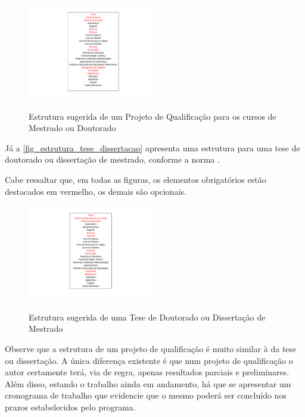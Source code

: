 \begin{apendicesenv}
    \begin{figure}[!htb]
        \centering
        \caption{Estrutura sugerida de um Projeto de Qualificação para os cursos de Mestrado ou Doutorado}
        \includegraphics[width=0.5\textwidth]{figuras/estrutura-projeto-qualificacao}
        \label{fig_estrutura_projeto_qualificacao}
    \end{figure}

    Já a \autoref{fig_estrutura_tese_dissertacao} apresenta uma estrutura para uma tese de doutorado ou dissertação de mestrado, conforme a norma .

    Cabe ressaltar que, em todas as figuras, os elementos obrigatórios estão destacados em vermelho, os demais são opcionais.

    \begin{figure}[!htb]
        \centering
        \caption{Estrutura sugerida de uma Tese de Doutorado ou Dissertação de Mestrado}
        \includegraphics[width=0.5\textwidth]{figuras/estrutura-tese-dissertacao}
        \label{fig_estrutura_tese_dissertacao}
    \end{figure}

    \newpage

    Observe que a estrutura de um projeto de qualificação é muito similar à da tese ou dissertação.
    A única diferença existente é que num projeto de qualificação o autor certamente terá, via de regra, apenas resultados parciais e preliminares.
    Além disso, estando o trabalho ainda em andamento, há que se apresentar um cronograma de trabalho que evidencie que o mesmo poderá ser concluído nos prazos estabelecidos pelo programa.


\end{apendicesenv}
